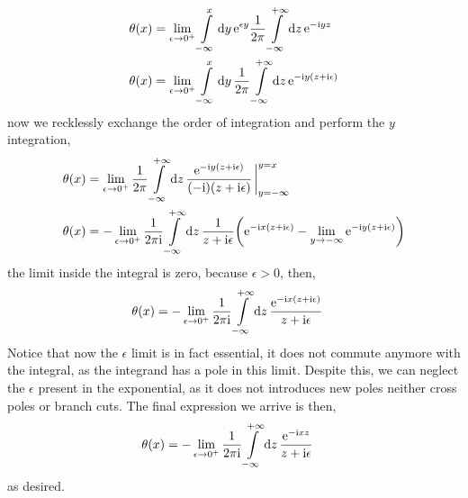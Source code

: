 \begin{align}
   \theta\qty(x)&=\lim\limits_{\epsilon\rightarrow0^+}\int\limits_{-\infty}^{x}\dd{y}\textnormal{e}^{\epsilon y}\frac{1}{2\pi}\int\limits_{-\infty}^{+\infty}\dd{z}\textnormal{e}^{-\textnormal{i} y z}\\
   \theta\qty(x)&=\lim\limits_{\epsilon\rightarrow0^+}\int\limits_{-\infty}^{x}\dd{y}\frac{1}{2\pi}\int\limits_{-\infty}^{+\infty}\dd{z}\textnormal{e}^{-\textnormal{i} y\qty( z+\textnormal{i}\epsilon)}
\end{align}
now we recklessly exchange the order of integration and perform the $y$ integration,
\begin{align}
   \theta\qty(x)&=\lim\limits_{\epsilon\rightarrow0^+}\frac{1}{2\pi}\int\limits_{-\infty}^{+\infty}\dd{z}\frac{\e^{-\im y\qty( z+\im\epsilon)}}{\qty(-\im)\qty(z+\im\epsilon)}\eval_{y=-\infty}^{y=x}\\
   \theta\qty(x)&=-\lim\limits_{\epsilon\rightarrow0^+}\frac{1}{2\pi \im}\int\limits_{-\infty}^{+\infty}\dd{z}\frac{1}{{z+\im\epsilon}}\qty(\e^{-\im x\qty( z+\im\epsilon)}-\lim\limits_{y\rightarrow -\infty}\e^{-\im y\qty( z+\im\epsilon)})
\end{align}
the limit inside the integral is zero, because $\epsilon>0$, then,
\begin{align}
   \theta\qty(x)&=-\lim\limits_{\epsilon\rightarrow0^+}\frac{1}{2\pi \textnormal{i}}\int\limits_{-\infty}^{+\infty}\dd{z}\frac{\textnormal{e}^{-\textnormal{i} x\qty( z+\textnormal{i}\epsilon)}}{{z+\textnormal{i}\epsilon}}
\end{align}
Notice that now the $\epsilon$ limit is in fact essential, it does not commute anymore with the integral, as the integrand has a pole in this limit. Despite this, we can neglect the $\epsilon$ 
present in the exponential, as it does not introduces new poles neither cross poles or branch cuts. The final expression we arrive is then,
\begin{align}
   \theta\qty(x)&=-\lim\limits_{\epsilon\rightarrow0^+}\frac{1}{2\pi \textnormal{i}}\int\limits_{-\infty}^{+\infty}\dd{z}\frac{\textnormal{e}^{-\textnormal{i} xz}}{{z+\textnormal{i}\epsilon}}
\end{align}
as desired.